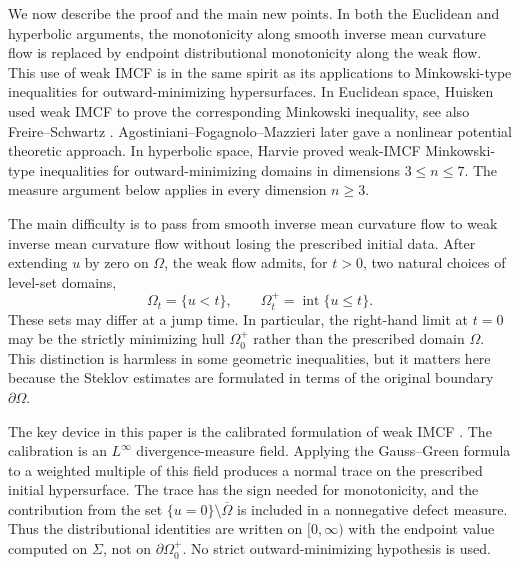 \documentclass[11pt,reqno]{amsart}
\numberwithin{equation}{section}
\theoremstyle{definition}
\begin{document}
We now describe the proof and the main new points.  In both the Euclidean and hyperbolic arguments, the monotonicity along smooth inverse mean curvature flow is replaced by endpoint distributional monotonicity along the weak flow.  This use of weak IMCF is in the same spirit as its applications to Minkowski-type inequalities for outward-minimizing hypersurfaces.  In Euclidean space, Huisken \cite{Huisken2009Lecture} used weak IMCF to prove the corresponding Minkowski inequality, see also Freire--Schwartz \cite{FS2014}.  Agostiniani--Fogagnolo--Mazzieri \cite{AFM2022} later gave a nonlinear potential theoretic approach.  In hyperbolic space, Harvie \cite{Harvie2026} proved weak-IMCF Minkowski-type inequalities for outward-minimizing domains in dimensions $3\leq n\leq7$.  The measure argument below applies in every dimension $n\geq3$.

The main difficulty is to pass from smooth inverse mean curvature
flow to weak inverse mean curvature flow without losing the
prescribed initial data. After extending $u$ by zero on $\Omega$,
the weak flow admits, for $t>0$, two natural choices of level-set
domains,
\begin{equation*}
    \Omega_t=\{u<t\},
    \qquad
    \Omega_t^+=\operatorname{int}\{u\leq t\}.
\end{equation*}
These sets may differ at a jump time. In particular, the
right-hand limit at $t=0$ may be the strictly minimizing hull
$\Omega_0^+$ rather than the prescribed domain $\Omega$. This
distinction is harmless in some geometric inequalities, but it
matters here because the Steklov estimates are formulated in terms
of the original boundary $\partial\Omega$.

The key device in this paper is the calibrated formulation of weak IMCF \cite[Section~3]{HI2001}.  The calibration is an $L^\infty$ divergence-measure field.  Applying the Gauss--Green formula to a weighted multiple of this field produces a normal trace on the prescribed initial hypersurface.  The trace has the sign needed for monotonicity, and the contribution from the set $\{u=0\}\setminus\overline\Omega$ is included in a nonnegative defect measure.  Thus the distributional identities are written on $[0,\infty)$ with the endpoint value computed on $\Sigma$, not on $\partial\Omega_0^+$. No strict outward-minimizing hypothesis is used.
\end{document}
